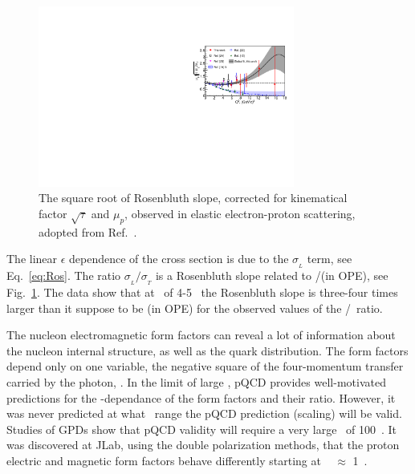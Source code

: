 \begin{figure}[h]
\includegraphics[trim = 0mm 0mm 0mm 40mm, width = 0.75\textwidth]{Plots/Fig1.pdf}
\caption{The square root of Rosenbluth slope, corrected for kinematical factor $\sqrt {\tau}$ and $\mu_p$, observed in elastic electron-proton scattering,
adopted from Ref.~\cite{Christy2020ab}.}
\label{pic:Fig1}
\end{figure}

The linear $\epsilon$ dependence of the cross section is due to the $\sigma_{_L}$ term, see Eq.~\ref{eq:Ros}.
The ratio $\sigma_{_L}/\sigma_{_T}$ is a Rosenbluth slope related to \gef/\gmf (in OPE), see Fig.~\ref{pic:Fig1}.
The data show that at \qsq~of 4-5 \gevcsq~the Rosenbluth slope is three-four times larger than it suppose to be (in OPE) for
the observed values of the \gep/\gmp~ratio.

%
The nucleon electromagnetic form factors can reveal a lot of information about the nucleon internal structure, as well as the quark distribution. 
The form factors depend only on one variable, the negative square of the four-momentum transfer carried by the photon, \qsq. 
In the limit of large \qsq, pQCD provides well-motivated predictions for the \qsq-dependance of the form factors and their ratio. 
However, it was never predicted at what \qsq~range the pQCD prediction (scaling) will be valid.
Studies of GPDs show that pQCD validity will require a very large \qsq~of 100~\gevcsq. 
It was discovered at JLab, using the double polarization methods, that the proton electric and magnetic form factors behave differently starting at \qsq~ $\approx$ 1~\gevcsq.
 

